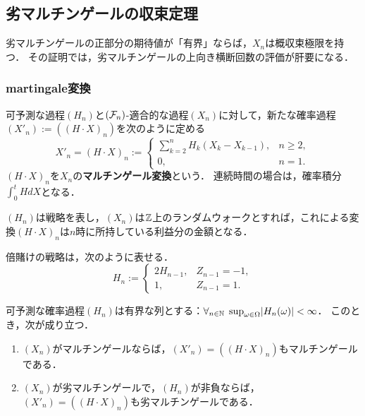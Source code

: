 \documentclass[uplatex,dvipdfmx]{jsreport}
\begin{document}
\subsection{劣マルチンゲールの収束定理}

\begin{tcolorbox}[colframe=ForestGreen, colback=ForestGreen!10!white,breakable,colbacktitle=ForestGreen!40!white,coltitle=black,fonttitle=\bfseries\sffamily,
title=]
    劣マルチンゲールの正部分の期待値が「有界」ならば，$X_n$は概収束極限を持つ．
    その証明では，劣マルチンゲールの上向き横断回数の評価が肝要になる．
\end{tcolorbox}

\subsubsection{martingale変換}

\begin{definition}
    可予測な過程$(H_n)$と$(\mathcal{F}_n)$-適合的な過程$(X_n)$に対して，新たな確率過程$(X'_n):=((H\cdot X)_n)$を次のように定める
    \[X'_n=(H\cdot X)_n:=\begin{cases}
        \sum^n_{k=2}H_k(X_k-X_{k-1}),&n\ge 2,\\
        0,&n=1.
    \end{cases}\]
    $(H\cdot X)_n$を$X_n$の\textbf{マルチンゲール変換}という．
    連続時間の場合は，確率積分$\int^t_0HdX$となる．
\end{definition}
\begin{remarks}
    $(H_n)$は戦略を表し，$(X_n)$は$\mathbb{Z}$上のランダムウォークとすれば，これによる変換$(H\cdot X)_n$は$n$時に所持している利益分の金額となる．
\end{remarks}

\begin{example}
    倍賭けの戦略は，次のように表せる．
    \[H_n:=\begin{cases}
        2H_{n-1},&Z_{n-1}=-1,\\
        1,&Z_{n-1}=1.
    \end{cases}\]
\end{example}

\begin{theorem}
    可予測な確率過程$(H_n)$は有界な列とする：$\forall_{n\in\mathbb{N}}\;\sup_{\omega\in\Omega}\lvert H_n(\omega)\rvert<\infty$．
    このとき，次が成り立つ．
    \begin{enumerate}
        \item $(X_n)$がマルチンゲールならば，$(X'_n)=((H\cdot X)_n)$もマルチンゲールである．
        \item $(X_n)$が劣マルチンゲールで，$(H_n)$が非負ならば，$(X'_n)=((H\cdot X)_n)$も劣マルチンゲールである．
    \end{enumerate}
\end{theorem}
\end{document}
